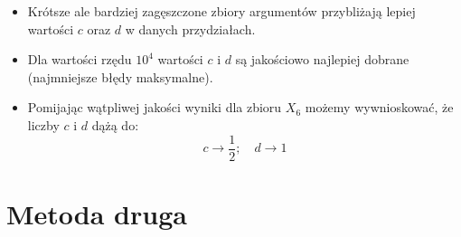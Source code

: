 \documentclass[11pt,wide]{mwart}
\begin{document}
\begin{itemize}

\item Krótsze ale bardziej zagęszczone zbiory argumentów przybliżają lepiej wartości $c$ oraz $d$ w danych przydziałach.

\item Dla wartości rzędu $10^4$ wartości $c$ i $d$ są jakościowo najlepiej dobrane (najmniejsze błędy maksymalne).

	
\item Pomijając wątpliwej jakości wyniki dla zbioru $X_6$ możemy wywnioskować, że liczby $c$ i $d$ dążą do:
	\begin{equation}
		c \to \frac{1}{2}; \quad d \to 1
	\end{equation}

\end{itemize}



\section{Metoda druga}
\end{document}

